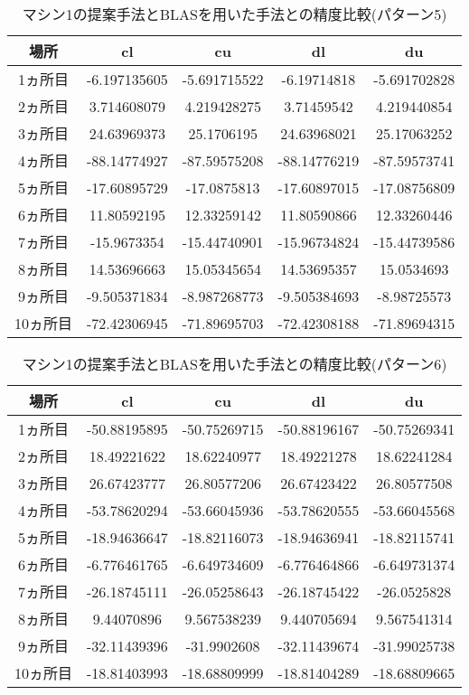 \documentclass[11pt,a4paper]{jsreport}
\theoremstyle{definition}
\begin{document}
\begin{table}[H]
\centering
\begin{tabular}{|c|c|c|c|c|}
\hline
場所 & cl & cu & dl & du \\ \hline
1ヵ所目 & -6.197135605 & -5.691715522 & -6.19714818 & -5.691702828 \\ \hline
2ヵ所目 & 3.714608079 & 4.219428275 & 3.71459542 & 4.219440854 \\ \hline
3ヵ所目 & 24.63969373 & 25.1706195 & 24.63968021 & 25.17063252 \\ \hline
4ヵ所目 & -88.14774927 & -87.59575208 & -88.14776219 & -87.59573741 \\ \hline
5ヵ所目 & -17.60895729 & -17.0875813 & -17.60897015 & -17.08756809 \\ \hline
6ヵ所目 & 11.80592195 & 12.33259142 & 11.80590866 & 12.33260446 \\ \hline
7ヵ所目 & -15.9673354 & -15.44740901 & -15.96734824 & -15.44739586 \\ \hline
8ヵ所目 & 14.53696663 & 15.05345654 & 14.53695357 & 15.0534693 \\ \hline
9ヵ所目 & -9.505371834 & -8.987268773 & -9.505384693 & -8.98725573 \\ \hline
10ヵ所目 & -72.42306945 & -71.89695703 & -72.42308188 & -71.89694315 \\ \hline
\end{tabular}
\caption{マシン1の提案手法とBLASを用いた手法との精度比較(パターン5)}
\end{table}

\begin{table}[H]
\centering
\begin{tabular}{|c|c|c|c|c|}
\hline
場所 & cl & cu & dl & du \\ \hline
1ヵ所目 & -50.88195895 & -50.75269715 & -50.88196167 & -50.75269341 \\ \hline
2ヵ所目 & 18.49221622 & 18.62240977 & 18.49221278 & 18.62241284 \\ \hline
3ヵ所目 & 26.67423777 & 26.80577206 & 26.67423422 & 26.80577508 \\ \hline
4ヵ所目 & -53.78620294 & -53.66045936 & -53.78620555 & -53.66045568 \\ \hline
5ヵ所目 & -18.94636647 & -18.82116073 & -18.94636941 & -18.82115741 \\ \hline
6ヵ所目 & -6.776461765 & -6.649734609 & -6.776464866 & -6.649731374 \\ \hline
7ヵ所目 & -26.18745111 & -26.05258643 & -26.18745422 & -26.0525828 \\ \hline
8ヵ所目 & 9.44070896 & 9.567538239 & 9.440705694 & 9.567541314 \\ \hline
9ヵ所目 & -32.11439396 & -31.9902608 & -32.11439674 & -31.99025738 \\ \hline
10ヵ所目 & -18.81403993 & -18.68809999 & -18.81404289 & -18.68809665 \\ \hline
\end{tabular}
\caption{マシン1の提案手法とBLASを用いた手法との精度比較(パターン6)}
\end{table}
\end{document}
